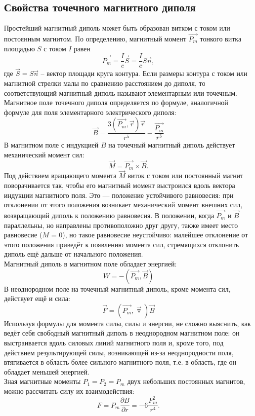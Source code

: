 \documentclass[a4paper,12pt]{article} %
\begin{document}
\subsection*{Свойства точечного магнитного диполя}
Простейший магнитный диполь может быть образован витком с током или постоянным магнитом. По определению, магнитный момент $\overrightarrow{P_m}$ тонкого витка площадью $S$ с током $I$ равен
$$
\overrightarrow{P_m}=\dfrac{I}{c}\vec{S}=\dfrac{I}{c}S\vec{n},
$$
где $\vec{S}=S\vec{n}$ -- вектор площади круга контура. Если размеры контура с током или магнитной стрелки малы по сравнению расстоянием до диполя, то соответствующий магнитный диполь называют элементарным или точечным.\\
Магнитное поле точечного диполя определяется по формуле, аналогичной формуле для поля
элементарного электрического диполя:
$$
\vec{B}=\dfrac{3(\overrightarrow{P_m},\vec{r})\vec{r}}{r^5} - \dfrac{\overrightarrow{P_m}}{r^3}
$$ 
В магнитном поле с индукцией $B$
на точечный магнитный диполь 
действует механический
момент сил:
$$
\vec{M} = \overrightarrow{P_m}\times \vec{B}.
$$
Под действием вращающего момента $\vec{M}$ виток с током или постоянный магнит поворачивается
так, чтобы его магнитный момент выстроился вдоль вектора индукции магнитного поля. Это —
положение устойчивого равновесия: при отклонении от этого положения возникает механический
момент внешних сил, возвращающий диполь к положению равновесия. В положении, когда $\overrightarrow{P_m}$ и $\vec{B}$
параллельны, но направлены противоположно друг другу, также имеет место равновесие ($M$ = 0),
но такое равновесие неустойчиво: малейшее отклонение от этого положения приведёт к появлению
момента сил, стремящихся отклонить диполь ещё дальше от начального положения.\\
Магнитный диполь в магнитном поле обладает энергией:
$$
W = -(\overrightarrow{P_m},\vec{B})
$$
В неоднородном поле на точечный магнитный диполь, кроме момента сил, действует ещё и сила:
$$
\vec{F}=(\overrightarrow{P_m},\vec{\triangledown})\vec{B}
$$
Используя формулы для момента силы, силы и энергии, не сложно выяснить, как ведёт себя
свободный магнитный диполь в неоднородном магнитном поле: он выстраивается вдоль силовых
линий магнитного поля и, кроме того, под действием результирующей силы, возникающей из-за
неоднородности поля, втягивается в область более сильного магнитного поля, т.е. в область, где он
обладает меньшей энергией.\\
Зная магнитные моменты $P_1 = P_2 = P_m$ двух небольших постоянных магнитов, можно рассчитать силу
их взаимодействия:
$$
F = P_m \dfrac{\partial B}{\partial r}=-6\dfrac{P_m^2}{r^4}.
$$
\end{document}
